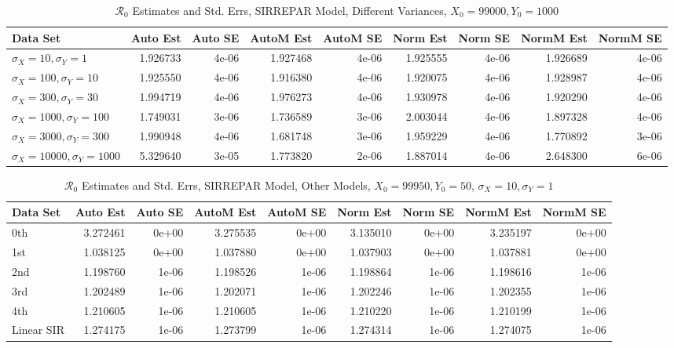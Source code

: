 \documentclass[12pt]{article}
\newcommand{\rr}{\ensuremath{\mathcal{R}_0}}
\begin{document}
\begin{table} [H]
	
	\caption{$\rr$ Estimates and Std. Errs, SIRREPAR Model,
		Different Variances, 
		$X_0 = 99000, Y_0 = 1000$}
	\begin{footnotesize}
		\hskip -1.7cm
		\begin{tabular}{l|r|r|r|r|r|r|r|r}
			\hline
			Data Set & Auto Est & Auto SE & AutoM Est & AutoM SE & Norm Est & Norm SE & NormM Est & NormM SE\\
			\hline
			$\sigma_X = 10, \sigma_Y = 1$ & 1.926733 & 4e-06 & 1.927468 & 4e-06 & 1.925555 & 4e-06 & 1.926689 & 4e-06\\
			\hline
			$\sigma_X = 100, \sigma_Y = 10$ & 1.925550 & 4e-06 & 1.916380 & 4e-06 & 1.920075 & 4e-06 & 1.928987 & 4e-06\\
			\hline
			$\sigma_X = 300, \sigma_Y = 30$ & 1.994719 & 4e-06 & 1.976273 & 4e-06 & 1.930978 & 4e-06 & 1.920290 & 4e-06\\
			\hline
			$\sigma_X = 1000, \sigma_Y = 100$ & 1.749031 & 3e-06 & 1.736589 & 3e-06 & 2.003044 & 4e-06 & 1.897328 & 4e-06\\
			\hline
			$\sigma_X = 3000, \sigma_Y = 300$ & 1.990948 & 4e-06 & 1.681748 & 3e-06 & 1.959229 & 4e-06 & 1.770892 & 3e-06\\
			\hline
			$\sigma_X = 10000, \sigma_Y = 1000$ & 5.329640 & 3e-05 & 1.773820 & 2e-06 & 1.887014 & 4e-06 & 2.648300 & 6e-06\\
			\hline
		\end{tabular}
	\end{footnotesize}
\end{table}
\begin{table}[H]
	
	\caption{$\rr$ Estimates and Std. Errs, SIRREPAR Model,
		Other Models, $X_0 = 99950, Y_0 = 50$, 
		$\sigma_X = 10, \sigma_Y = 1$}
	\begin{footnotesize}
		\hskip -1cm
		\begin{tabular}{l|r|r|r|r|r|r|r|r}
			\hline
			Data Set & Auto Est & Auto SE & AutoM Est & AutoM SE & Norm Est & Norm SE & NormM Est & NormM SE\\
			\hline
			0th & 3.272461 & 0e+00 & 3.275535 & 0e+00 & 3.135010 & 0e+00 & 3.235197 & 0e+00\\
			\hline
			1st & 1.038125 & 0e+00 & 1.037880 & 0e+00 & 1.037903 & 0e+00 & 1.037881 & 0e+00\\
			\hline
			2nd & 1.198760 & 1e-06 & 1.198526 & 1e-06 & 1.198864 & 1e-06 & 1.198616 & 1e-06\\
			\hline
			3rd & 1.202489 & 1e-06 & 1.202071 & 1e-06 & 1.202246 & 1e-06 & 1.202355 & 1e-06\\
			\hline
			4th & 1.210605 & 1e-06 & 1.210605 & 1e-06 & 1.210220 & 1e-06 & 1.210199 & 1e-06\\
			\hline
			Linear SIR & 1.274175 & 1e-06 & 1.273799 & 1e-06 & 1.274314 & 1e-06 & 1.274075 & 1e-06\\
			\hline
		\end{tabular}
	\end{footnotesize}
\end{table}
\end{document}
